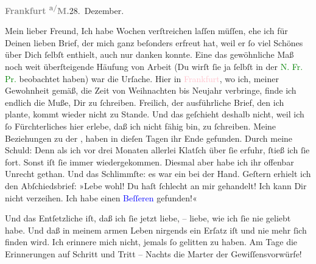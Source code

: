 \pstart
           \raggedleft{}\textcolor{pink}{\textcolor{gray}{\textbf{Frankfurt \textsuperscript{a/}M.}}}{}\ledrightnote{\textcolor{pink}{Frankfurt am Main}}{ }28. Dezember.\pend
           
\pstart\center{}Mein lieber Freund,\pend
\pstart
           Ich habe Wochen verſtreichen laſſen müſſen, ehe ich für Deinen lieben Brief, der mich
               ganz beſonders erfreut hat, weil er ſo viel Schönes über Dich ſelbſt enthielt, auch
               nur danken konnte. Eine das gewöhnliche Maß noch weit überſteigende Häufung von
               Arbeit (Du wirſt ſie ja ſelbſt in der \textcolor{green}{N. Fr. Pr.}{}\ledrightnote{\textcolor{green}{Neue Freie Presse}}
               beobachtet haben) war die Urſache. Hier in \textcolor{pink}{Frankfurt}{}\ledrightnote{\textcolor{pink}{Frankfurt am Main}}, wo ich, meiner Gewohnheit gemäß, die Zeit von Weihnachten bis Neujahr
               verbringe, finde ich endlich die {\pb}Muße, Dir zu
               ſchreiben. Freilich, der ausführliche Brief, den ich plante, kommt wieder nicht zu
               Stande. Und das geſchieht deshalb nicht, weil ich ſo Fürchterliches hier erlebe, daß
               ich nicht fähig bin, zu ſchreiben. Meine Beziehungen zu der \label{K_L03231-2v}\label{K_L03231-2h}, haben in dieſen Tagen ihr Ende gefunden. Durch meine Schuld: Denn als ich
               vor drei Monaten allerlei Klatſch über ſie erfuhr, ſtieß ich ſie fort. Sonst iſt ſie
               immer wiedergekommen. Diesmal aber habe ich ihr offenbar Unrecht gethan. Und das
               Schlimmſte: es war ein \label{K_L03231-3v}\label{K_L03231-3h} bei der Hand.
                  Geſtern erhielt ich den Abſchiedsbrief: »Lebe wohl!
               Du haſt ſchlecht an mir gehandelt! Ich kann Dir nicht verzeihen. Ich habe einen \textcolor{blue}{Beſſeren}{}\ledrightnote{{$\rightarrow$}\textcolor{blue}{?? [Liebhaber von Theodore Rottenberg, Ende 1902 und Anfang 1903]}} gefunden!«\pend
           
\pstart
           Und das Entſetzliche iſt, daß ich ſie jetzt liebe, – liebe, wie ich ſie nie geliebt
               habe. Und daß in meinem armen Leben nirgends ein Erſatz iſt und nie mehr ſich finden
               wird. Ich erinnere mich nicht, jemals ſo gelitten zu haben. Am Tage die Erinnerungen
               auf Schritt und Tritt – Nachts die Marter {\pb}der
               Gewiſſensvorwürfe!\pend
           
